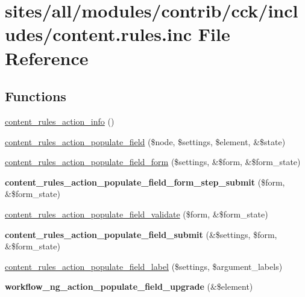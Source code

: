 \hypertarget{content_8rules_8inc}{
\section{sites/all/modules/contrib/cck/includes/content.rules.inc File Reference}
\label{content_8rules_8inc}
}
\subsection*{Functions}
\begin{CompactItemize}
\item 
\hyperlink{content_8rules_8inc_582a8b04d0ab9eaa87145cfc537a711a}{content\_\-rules\_\-action\_\-info} ()
\item 
\hyperlink{content_8rules_8inc_8bd75d5decd13b84f2ba7756c9a5f520}{content\_\-rules\_\-action\_\-populate\_\-field} (\$node, \$settings, \$element, \&\$state)
\item 
\hyperlink{content_8rules_8inc_937a26d1f8114aba412ecb130e95b419}{content\_\-rules\_\-action\_\-populate\_\-field\_\-form} (\$settings, \&\$form, \&\$form\_\-state)
\item 
\hypertarget{content_8rules_8inc_4c99f3f4d2ee16e2e23e94e3735b9f4f}{
\textbf{content\_\-rules\_\-action\_\-populate\_\-field\_\-form\_\-step\_\-submit} (\$form, \&\$form\_\-state)}
\label{content_8rules_8inc_4c99f3f4d2ee16e2e23e94e3735b9f4f}

\item 
\hyperlink{content_8rules_8inc_2e53cf864b6d710c7b3593abcd5caa92}{content\_\-rules\_\-action\_\-populate\_\-field\_\-validate} (\$form, \&\$form\_\-state)
\item 
\hypertarget{content_8rules_8inc_4462df5710fa9c92bd878121df4d0863}{
\textbf{content\_\-rules\_\-action\_\-populate\_\-field\_\-submit} (\&\$settings, \$form, \&\$form\_\-state)}
\label{content_8rules_8inc_4462df5710fa9c92bd878121df4d0863}

\item 
\hyperlink{content_8rules_8inc_26c7f76369ba92878a824253220427de}{content\_\-rules\_\-action\_\-populate\_\-field\_\-label} (\$settings, \$argument\_\-labels)
\item 
\hypertarget{content_8rules_8inc_9c8230f47ccd3f3d32335409cfef51be}{
\textbf{workflow\_\-ng\_\-action\_\-populate\_\-field\_\-upgrade} (\&\$element)}
\label{content_8rules_8inc_9c8230f47ccd3f3d32335409cfef51be}


\end{CompactItemize}
